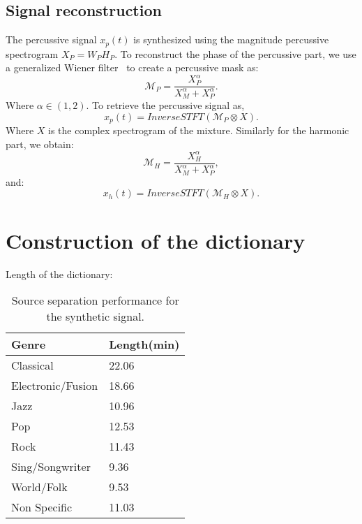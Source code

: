 \documentclass{article}
\begin{document}
 
\subsection{Signal reconstruction}

The percussive signal $x_p(t)$ is synthesized using the magnitude percussive spectrogram $X_P = W_PH_P$. To reconstruct the phase of the percussive part, we use a generalized Wiener filter~\cite{liutkus:hal-01110028} to create a percussive mask as:
\begin{equation}
\mathcal{M}_P = \frac{X_P^\alpha}{X_M^\alpha + X_P^\alpha}.
\end{equation} 
Where $\alpha \in (1,2)$. To retrieve the percussive signal as, 
\begin{equation}
x_p(t) = InverseSTFT(\mathcal{M}_P \otimes X).
\end{equation}
Where $X$ is the complex spectrogram of the mixture.
Similarly for the harmonic part, we obtain:
\begin{equation}\label{percuweiner}
\mathcal{M}_H = \frac{X_H^\alpha}{X_M^\alpha + X_P^\alpha},
\end{equation}
and:
\begin{equation}
x_h(t) = InverseSTFT(\mathcal{M}_H \otimes X).
\end{equation}




\section{Construction of the dictionary}


Length of the dictionary: 

\begin{table}
   
	\centering 
   \begin{tabular}{|l|l|}
   	\hline   
   Genre & Length(min)\\
  \hline
Classical  & 22.06 \\
  \hline
Electronic/Fusion & 18.66\\
	\hline
Jazz & 10.96\\
\hline
Pop &  12.53 \\
\hline
Rock & 11.43\\
\hline
Sing/Songwriter	& 9.36\\
\hline
World/Folk & 9.53\\
\hline
Non Specific & 11.03\\
\hline
  
\end{tabular} 
\caption{\label{resultONMF2} Source separation performance for the synthetic signal.}


\end{table}
\vspace{-0.4cm}
\end{document}
